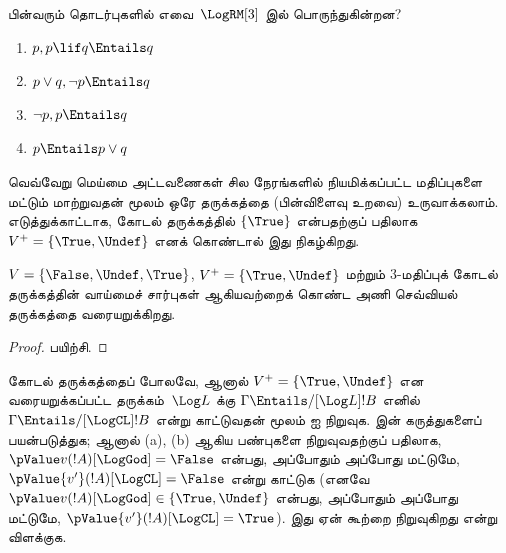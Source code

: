 \documentclass[../../../include/open-logic-section]{subfiles}
\begin{document}
\begin{prob}
  பின்வரும் தொடர்புகளில் எவை~$\LogRM[3]$ இல் பொருந்துகின்றன?
  \begin{enumerate}
    \item $p, p \lif q \Entails q$
    \item $p \lor q, \lnot p \Entails q$
    \item $\lnot p, p \Entails q$
    \item $p \Entails p \lor q$
  \end{enumerate}
\end{prob}

வெவ்வேறு மெய்மை அட்டவணைகள் சில நேரங்களில் நியமிக்கப்பட்ட மதிப்புகளை மட்டும்
மாற்றுவதன் மூலம் ஒரே தருக்கத்தை (பின்விளைவு உறவை) உருவாக்கலாம்.
எடுத்துக்காட்டாக, கோடல் தருக்கத்தில் $\{\True\}$ என்பதற்குப் பதிலாக
$V^+ = \{\True, \Undef\}$ எனக் கொண்டால் இது நிகழ்கிறது.

\begin{prop}
  $V = \{\False, \Undef,\True\}$, $V^+=\{\True,
  \Undef\}$ மற்றும் $3$-மதிப்புக் கோடல் தருக்கத்தின் வாய்மைச் சார்புகள்
  ஆகியவற்றைக் கொண்ட அணி செவ்வியல் தருக்கத்தை வரையறுக்கிறது.
\end{prop}

\begin{proof}
  பயிற்சி.
\end{proof}

\begin{prob}
  கோடல் தருக்கத்தைப் போலவே, ஆனால் $V^+=\{\True,\Undef\}$ என
  வரையறுக்கப்பட்ட தருக்கம்~$\Log L$ க்கு
  $\Gamma \Entails/[\Log L] !B$ எனில்
  $\Gamma \Entails/[\LogCL] !B$ என்று காட்டுவதன் மூலம்
   ஐ நிறுவுக.
   இன் கருத்துகளைப் பயன்படுத்துக;
  ஆனால் (a), (b) ஆகிய பண்புகளை நிறுவுவதற்குப் பதிலாக,
  $\pValue v(!A)[\LogGod] = \False$ என்பது, அப்போதும் அப்போது மட்டுமே,
  $\pValue {v'}(!A)[\LogCL] = \False$ என்று காட்டுக (எனவே
  $\pValue v(!A)[\LogGod] \in \{\True,\Undef\}$ என்பது, அப்போதும்
  அப்போது மட்டுமே, $\pValue {v'}(!A)[\LogCL] = \True$). இது ஏன்
  கூற்றை நிறுவுகிறது என்று விளக்குக.
\end{prob}
\end{document}
